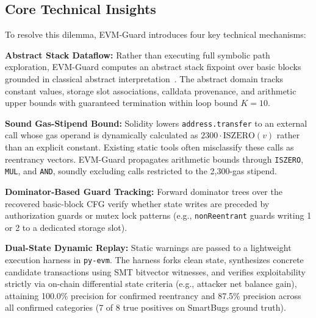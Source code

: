 \documentclass[conference]{IEEEtran}
\begin{document}
\subsection{Core Technical Insights}
To resolve this dilemma, EVM-Guard introduces four key technical mechanisms:

\smallskip
\noindent\textbf{Abstract Stack Dataflow:} Rather than executing full symbolic path exploration, EVM-Guard computes an abstract stack fixpoint over basic blocks grounded in classical abstract interpretation~\cite{cousot1977abstract}. The abstract domain tracks constant values, storage slot associations, calldata provenance, and arithmetic upper bounds with guaranteed termination within loop bound $K = 10$.

\smallskip
\noindent\textbf{Sound Gas-Stipend Bound:} Solidity lowers \texttt{address.transfer} to an external call whose gas operand is dynamically calculated as $2300 \cdot \mathrm{ISZERO}(v)$ rather than an explicit constant. Existing static tools often misclassify these calls as reentrancy vectors. EVM-Guard propagates arithmetic bounds through \texttt{ISZERO}, \texttt{MUL}, and \texttt{AND}, soundly excluding calls restricted to the 2,300-gas stipend.

\smallskip
\noindent\textbf{Dominator-Based Guard Tracking:} Forward dominator trees over the recovered basic-block CFG verify whether state writes are preceded by authorization guards or mutex lock patterns (e.g., \texttt{nonReentrant} guards writing 1 or 2 to a dedicated storage slot).

\smallskip
\noindent\textbf{Dual-State Dynamic Replay:} Static warnings are passed to a lightweight execution harness in \texttt{py-evm}. The harness forks clean state, synthesizes concrete candidate transactions using SMT bitvector witnesses, and verifies exploitability strictly via on-chain differential state criteria (e.g., attacker net balance gain), attaining 100.0\% precision for confirmed reentrancy and 87.5\% precision across all confirmed categories (7 of 8 true positives on SmartBugs ground truth).
\end{document}
